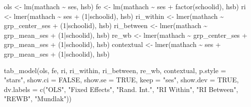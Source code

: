 \documentclass[
  letterpaper,
  DIV=11,
  numbers=noendperiod]{scrreprt}
\newenvironment{Shaded}{}{}
\newcommand{\AttributeTok}[1]{\textcolor[rgb]{0.49,0.56,0.16}{#1}}
\newcommand{\ConstantTok}[1]{\textcolor[rgb]{0.53,0.00,0.00}{#1}}
\newcommand{\DecValTok}[1]{\textcolor[rgb]{0.25,0.63,0.44}{#1}}
\newcommand{\FunctionTok}[1]{\textcolor[rgb]{0.02,0.16,0.49}{#1}}
\newcommand{\NormalTok}[1]{#1}
\newcommand{\OtherTok}[1]{\textcolor[rgb]{0.00,0.44,0.13}{#1}}
\newcommand{\SpecialCharTok}[1]{\textcolor[rgb]{0.25,0.44,0.63}{#1}}
\newcommand{\StringTok}[1]{\textcolor[rgb]{0.25,0.44,0.63}{#1}}
\begin{document}
\begin{Shaded}
\begin{Highlighting}[]
\NormalTok{ols }\OtherTok{\textless{}{-}} \FunctionTok{lm}\NormalTok{(mathach }\SpecialCharTok{\textasciitilde{}}\NormalTok{ ses, hsb)}
\NormalTok{fe }\OtherTok{\textless{}{-}} \FunctionTok{lm}\NormalTok{(mathach }\SpecialCharTok{\textasciitilde{}}\NormalTok{ ses }\SpecialCharTok{+} \FunctionTok{factor}\NormalTok{(schoolid), hsb)}
\NormalTok{ri }\OtherTok{\textless{}{-}} \FunctionTok{lmer}\NormalTok{(mathach }\SpecialCharTok{\textasciitilde{}}\NormalTok{ ses }\SpecialCharTok{+}\NormalTok{ (}\DecValTok{1}\SpecialCharTok{|}\NormalTok{schoolid), hsb)}
\NormalTok{ri\_within }\OtherTok{\textless{}{-}} \FunctionTok{lmer}\NormalTok{(mathach }\SpecialCharTok{\textasciitilde{}}\NormalTok{ grp\_center\_ses }\SpecialCharTok{+}\NormalTok{ (}\DecValTok{1}\SpecialCharTok{|}\NormalTok{schoolid), hsb)}
\NormalTok{ri\_between }\OtherTok{\textless{}{-}} \FunctionTok{lmer}\NormalTok{(mathach }\SpecialCharTok{\textasciitilde{}}\NormalTok{ grp\_mean\_ses }\SpecialCharTok{+}\NormalTok{ (}\DecValTok{1}\SpecialCharTok{|}\NormalTok{schoolid), hsb)}
\NormalTok{re\_wb }\OtherTok{\textless{}{-}} \FunctionTok{lmer}\NormalTok{(mathach }\SpecialCharTok{\textasciitilde{}}\NormalTok{ grp\_center\_ses }\SpecialCharTok{+}\NormalTok{ grp\_mean\_ses }\SpecialCharTok{+}\NormalTok{ (}\DecValTok{1}\SpecialCharTok{|}\NormalTok{schoolid), hsb)}
\NormalTok{contextual }\OtherTok{\textless{}{-}} \FunctionTok{lmer}\NormalTok{(mathach }\SpecialCharTok{\textasciitilde{}}\NormalTok{ ses }\SpecialCharTok{+}\NormalTok{ grp\_mean\_ses }\SpecialCharTok{+}\NormalTok{ (}\DecValTok{1}\SpecialCharTok{|}\NormalTok{schoolid), hsb)}

\FunctionTok{tab\_model}\NormalTok{(ols, fe, ri, ri\_within, ri\_between, re\_wb, contextual,}
          \AttributeTok{p.style =} \StringTok{"stars"}\NormalTok{,}
          \AttributeTok{show.ci =} \ConstantTok{FALSE}\NormalTok{,}
          \AttributeTok{show.se =} \ConstantTok{TRUE}\NormalTok{,}
          \AttributeTok{keep =} \StringTok{"ses"}\NormalTok{,}
          \AttributeTok{show.dev =} \ConstantTok{TRUE}\NormalTok{,}
          \AttributeTok{dv.labels =} \FunctionTok{c}\NormalTok{(}\StringTok{"OLS"}\NormalTok{,}
                        \StringTok{"Fixed Effects"}\NormalTok{,}
                        \StringTok{"Rand. Int."}\NormalTok{,}
                        \StringTok{"RI Within"}\NormalTok{,}
                        \StringTok{"RI Between"}\NormalTok{,}
                        \StringTok{"REWB"}\NormalTok{,}
                        \StringTok{"Mundlak"}\NormalTok{))}
\end{Highlighting}
\end{Shaded}
\end{document}
